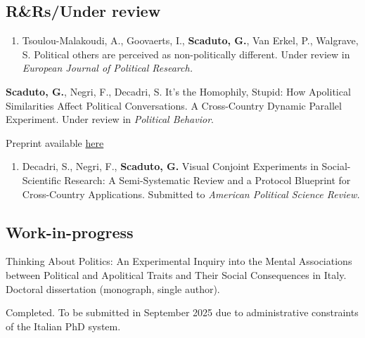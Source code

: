 \documentclass[10pt,]{article}
\providecommand{\tightlist}{%
  \setlength{\itemsep}{0pt}\setlength{\parskip}{0pt}}
\renewenvironment{itemize}{
  \begin{list}{}{
    \setlength{\leftmargin}{1.5em}
  }
}{
  \end{list}
}
\begin{document}
\subsection{R\&Rs/Under review}\label{rrsunder-review}

\begin{enumerate}
\def\labelenumi{\arabic{enumi}.}
\setcounter{enumi}{2}
\tightlist
\item
  Tsoulou-Malakoudi, A., Goovaerts, I., \textbf{Scaduto, G.}, Van Erkel,
  P., Walgrave, S. Political others are perceived as non-politically
  different. Under review in \emph{European Journal of Political
  Research.}
\end{enumerate}

\begin{enumerate}
\def\labelenumi{\arabic{enumi}.}
\setcounter{enumi}{1}
\tightlist
\item
  \textbf{Scaduto, G.}, Negri, F., Decadri, S. It's the Homophily,
  Stupid: How Apolitical Similarities Affect Political Conversations. A
  Cross-Country Dynamic Parallel Experiment. Under review in
  \emph{Political Behavior}.

  \begin{itemize}
  \tightlist
  \item
    Preprint available
    \href{https://osf.io/preprints/socarxiv/6j8nr_v1}{here}
  \end{itemize}
\end{enumerate}

\begin{enumerate}
\def\labelenumi{\arabic{enumi}.}
\tightlist
\item
  Decadri, S., Negri, F., \textbf{Scaduto, G.} Visual Conjoint
  Experiments in Social-Scientific Research: A Semi-Systematic Review
  and a Protocol Blueprint for Cross-Country Applications. Submitted to
  \emph{American Political Science Review.}
\end{enumerate}

\subsection{Work-in-progress}\label{work-in-progress}

\begin{enumerate}
\def\labelenumi{\arabic{enumi}.}
\setcounter{enumi}{5}
\tightlist
\item
  Thinking About Politics: An Experimental Inquiry into the Mental
  Associations between Political and Apolitical Traits and Their Social
  Consequences in Italy. Doctoral dissertation (monograph, single
  author).

  \begin{itemize}
  \tightlist
  \item
    Completed. To be submitted in September 2025 due to administrative
    constraints of the Italian PhD system.
  \end{itemize}
\end{enumerate}
\end{document}
